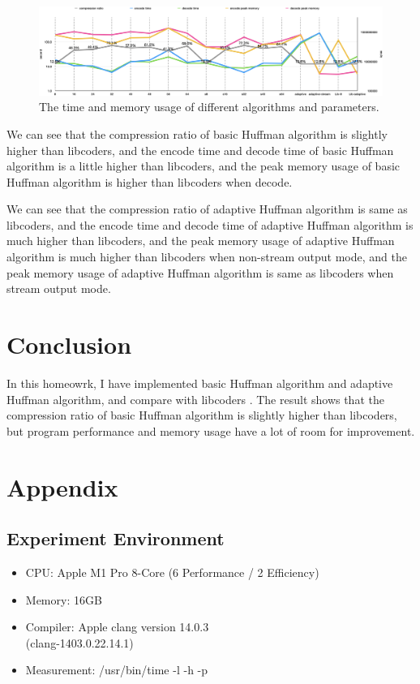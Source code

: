 \documentclass[a4paper,conference]{IEEEtran}
\begin{document}
\begin{figure}[htbp]
\centerline{\includegraphics[width=20cm, keepaspectratio,]{assets/chart-time-memory.png}}
\caption{The time and memory usage of different algorithms and parameters.}
\label{fig-chart-time-memory}
\end{figure}

We can see that the compression ratio of basic Huffman algorithm is slightly higher than libcoders, and the encode time and decode time of basic Huffman algorithm is a little higher than libcoders, and the peak memory usage of basic Huffman algorithm is higher than libcoders when decode.

We can see that the compression ratio of adaptive Huffman algorithm is same as libcoders, and the encode time and decode time of adaptive Huffman algorithm is much higher than libcoders, and the peak memory usage of adaptive Huffman algorithm is much higher than libcoders when non-stream output mode, and the peak memory usage of adaptive Huffman algorithm is same as libcoders when stream output mode.

\section{Conclusion}

In this homeowrk, I have implemented basic Huffman algorithm and adaptive Huffman algorithm, and compare with libcoders \cite{libcoders}. The result shows that the compression ratio of basic Huffman algorithm is slightly higher than libcoders, but program performance and memory usage have a lot of room for improvement.

\section{Appendix}

\subsection{Experiment Environment}

\begin{itemize}
\item CPU: Apple M1 Pro 8-Core (6 Performance / 2 Efficiency)
\item Memory: 16GB
\item Compiler: Apple clang version 14.0.3 \\ (clang-1403.0.22.14.1)
\item Measurement: /usr/bin/time -l -h -p
\end{itemize}
\end{document}
